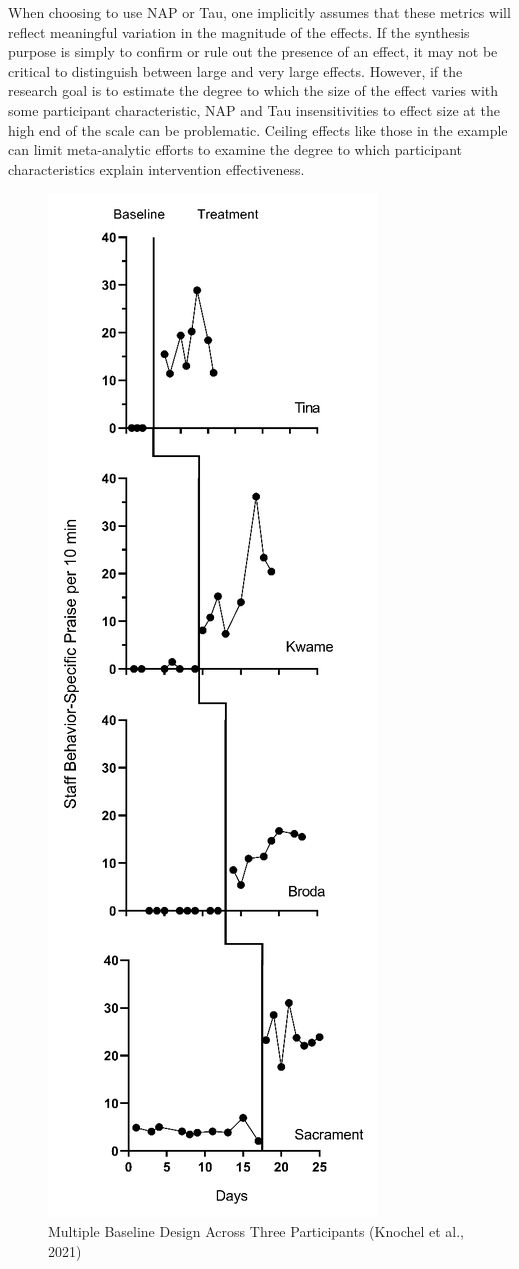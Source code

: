 \documentclass[
]{book}
\begin{document}
When choosing to use NAP or Tau, one implicitly assumes that these metrics will reflect meaningful variation in the magnitude of the effects. If the synthesis purpose is simply to confirm or rule out the presence of an effect, it may not be critical to distinguish between large and very large effects. However, if the research goal is to estimate the degree to which the size of the effect varies with some participant characteristic, NAP and Tau insensitivities to effect size at the high end of the scale can be problematic. Ceiling effects like those in the \citet{knochel2021culturally} example can limit meta-analytic efforts to examine the degree to which participant characteristics explain intervention effectiveness.

\begin{figure}
\includegraphics[width=0.6\linewidth]{images/Knochel2021} \caption{Multiple Baseline Design Across Three Participants (Knochel et al., 2021)}\label{fig:Knochel-2021}
\end{figure}
\end{document}

